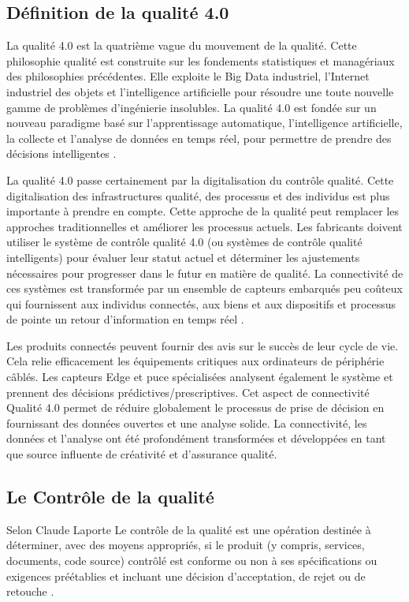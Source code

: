 \subsection{Définition de la qualité 4.0}
La qualité 4.0 est la quatrième vague du mouvement de la qualité. Cette philosophie qualité est construite sur les fondements statistiques et managériaux des philosophies précédentes. Elle exploite le Big Data industriel, l'Internet industriel des objets et l'intelligence artificielle pour résoudre une toute nouvelle gamme de problèmes d'ingénierie insolubles. La qualité 4.0 est fondée sur un nouveau paradigme basé sur l'apprentissage automatique, l’intelligence artificielle, la collecte et l'analyse de données en temps réel, pour permettre de prendre des décisions intelligentes \cite{escobarQualityReviewBig2021}.

La qualité 4.0 passe certainement par la digitalisation du contrôle qualité. Cette digitalisation des infrastructures qualité, des processus et des individus est plus importante à prendre en compte. Cette approche de la qualité peut remplacer les approches traditionnelles et améliorer les processus actuels. Les fabricants doivent utiliser le système de contrôle qualité 4.0 (ou systèmes de contrôle qualité intelligents) pour évaluer leur statut actuel et déterminer les ajustements nécessaires pour progresser dans le futur en matière de qualité. La connectivité de ces systèmes est transformée par un ensemble de capteurs embarqués peu coûteux qui fournissent aux individus connectés, aux biens et aux dispositifs et processus de pointe un retour d'information en temps réel \cite{javaidSignificanceQualityComprehensive2021}.

Les produits connectés peuvent fournir des avis sur le succès de leur cycle de vie. Cela relie efficacement les équipements critiques aux ordinateurs de périphérie câblés. Les capteurs Edge et puce spécialisées analysent également le système et prennent des décisions prédictives/prescriptives. Cet aspect de connectivité Qualité 4.0 permet de réduire globalement le processus de prise de décision en fournissant des données ouvertes et une analyse solide. La connectivité, les données et l'analyse ont été profondément transformées et développées en tant que source influente de créativité et d'assurance qualité.

\subsection{Le Contrôle de la qualité}
Selon Claude Laporte Le contrôle de la qualité est une opération destinée à déterminer, avec des moyens appropriés, si le produit (y compris, services, documents, code source) contrôlé est conforme ou non à ses spécifications ou exigences préétablies et incluant une décision d'acceptation, de rejet ou de retouche \cite{aprilAssuranceQualiteLogicielle2011b}.

